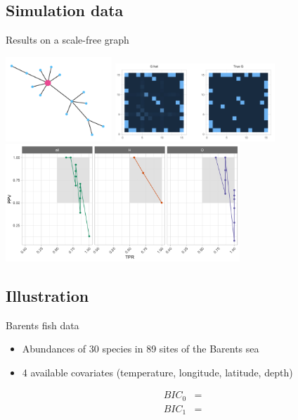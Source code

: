 \documentclass[11pt]{beamer}
\begin{document}
\subsection{Simulation data}
\begin{frame}{Results on a scale-free graph}
\begin{center}
\includegraphics[width=4cm]{images/SFgraph}
\pause
\includegraphics[width=6cm]{images/Ghat}\\
\pause
\includegraphics[width=8.8cm]{images/precrec_missing.png}
\end{center}
\end{frame}
\subsection{Illustration}
\begin{frame}{Barents fish data}
\begin{itemize}
\item Abundances of 30 species in 89 sites of the Barents sea
\item 4 available covariates (temperature, longitude, latitude, depth)
\end{itemize}

\begin{align*}
BIC_0 &= \\
BIC_1 &=
\end{align*}
\end{frame}
\end{document}
